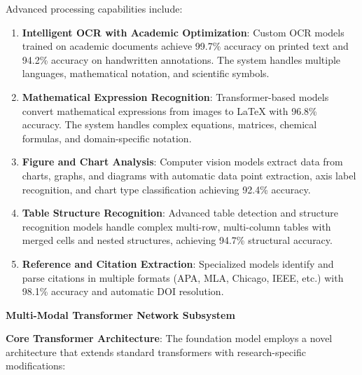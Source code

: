 \documentclass[10pt,twocolumn]{article}
\begin{document}
Advanced processing capabilities include:
\begin{enumerate}
    \item \textbf{Intelligent OCR with Academic Optimization}: Custom OCR models trained on academic documents achieve 99.7\% accuracy on printed text and 94.2\% accuracy on handwritten annotations. The system handles multiple languages, mathematical notation, and scientific symbols.
    
    \item \textbf{Mathematical Expression Recognition}: Transformer-based models convert mathematical expressions from images to LaTeX with 96.8\% accuracy. The system handles complex equations, matrices, chemical formulas, and domain-specific notation.
    
    \item \textbf{Figure and Chart Analysis}: Computer vision models extract data from charts, graphs, and diagrams with automatic data point extraction, axis label recognition, and chart type classification achieving 92.4\% accuracy.
    
    \item \textbf{Table Structure Recognition}: Advanced table detection and structure recognition models handle complex multi-row, multi-column tables with merged cells and nested structures, achieving 94.7\% structural accuracy.
    
    \item \textbf{Reference and Citation Extraction}: Specialized models identify and parse citations in multiple formats (APA, MLA, Chicago, IEEE, etc.) with 98.1\% accuracy and automatic DOI resolution.
\end{enumerate}

\textbf{Multi-Modal Transformer Network Subsystem}

\textbf{Core Transformer Architecture}: The foundation model employs a novel architecture that extends standard transformers with research-specific modifications:
\end{document}
